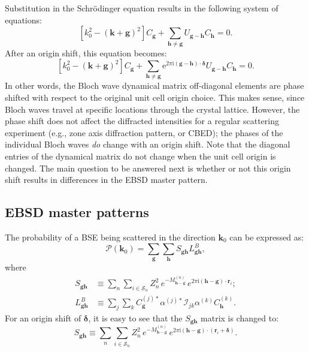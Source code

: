 \documentclass[12pt]{amsart}
\begin{document}
Substitution in the Schr\"odinger equation results in the following system of equations:
\begin{equation}
	\left[k_0^2-(\mathbf{k}+\mathbf{g})^2\right]C_{\mathbf{g}} + 
	\sum_{\mathbf{h}\neq 
	\mathbf{g}}U_{\mathbf{g}-\mathbf{h}}C_{\mathbf{h}}=0.
	\label{eq:bloch}
\end{equation}
After an origin shift, this equation becomes:
\begin{equation}
	\left[k_0^2-(\mathbf{k}+\mathbf{g})^2\right]C_{\mathbf{g}} + 
	\sum_{\mathbf{h}\neq 
	\mathbf{g}} \mathrm{e}^{2\pi\mathrm{i}(\mathbf{g}-\mathbf{h})\cdot\bm{\delta}}U_{\mathbf{g}-\mathbf{h}}C_{\mathbf{h}}=0.
	\label{eq:blochshifted}
\end{equation}
In other words, the Bloch wave dynamical matrix off-diagonal elements are phase shifted with respect to the original unit cell origin choice.
This makes sense, since Bloch waves travel at specific locations through the crystal lattice. However, the phase shift does not affect the 
diffracted intensities for a regular scattering experiment (e.g., zone axis diffraction pattern, or CBED); the phases of the individual 
Bloch waves \textit{do} change with an origin shift.  Note that the diagonal entries of the dynamical matrix do not change when the unit cell origin is changed.
The main question to be answered next is whether or not this origin shift results in differences in the EBSD master pattern.

\subsection{EBSD master patterns}
The probability of a BSE being scattered in the direction $\mathbf{k}_0$ can be expressed as:
\begin{equation}
	\mathcal{P}(\mathbf{k}_0) = \sum_{\mathbf{g}} 
    \sum_{\mathbf{h}} S_{\mathbf{g}\mathbf{h}}L^B_{\mathbf{g}\mathbf{h}},
    \label{eq:prob}
\end{equation}
where
\begin{subequations}
\begin{align}
    S_{\mathbf{g}\mathbf{h}} &\equiv \sum_{n}\sum_{i\in\mathcal{S}_n} Z^2_n\,e^{-M^{(n)}_{\mathbf{h}-\mathbf{g}}}\,e^{2\pi\mathrm{i} 
    (\mathbf{h}-\mathbf{g})\cdot\mathbf{r}_{i}};\label{eq:defa}\\
    L^B_{\mathbf{g}\mathbf{h}} &\equiv \sum_{j}\sum_{k} 
    C^{(j)\ast}_{\mathbf{g}}\alpha^{(j)\ast}\mathcal{I}_{jk}\alpha^{(k)}
    C^{(k)}_{\mathbf{h}}.\label{eq:defb}
\end{align}
\end{subequations}
For an origin shift of $\bm{\delta}$, it is easy to see that the $S_{\mathbf{g}\mathbf{h}}$ matrix is changed to:
\begin{equation}
	S_{\mathbf{g}\mathbf{h}} \equiv \sum_{n}\sum_{i\in\mathcal{S}_n} Z^2_n\,e^{-M^{(n)}_{\mathbf{h}-\mathbf{g}}}\,e^{2\pi\mathrm{i} 
    (\mathbf{h}-\mathbf{g})\cdot(\mathbf{r}_{i}+\bm{\delta})}.\label{eq:defa2}
\end{equation}
\end{document}

